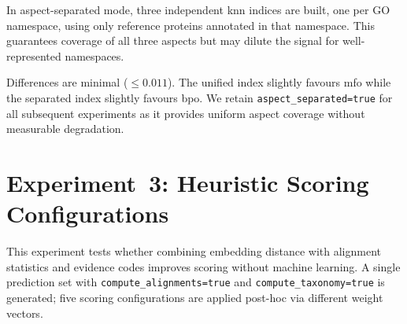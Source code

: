 In aspect-separated mode, three independent \gls{knn} indices are built, one
per GO namespace, using only reference proteins annotated in that namespace.
This guarantees coverage of all three aspects but may dilute the signal for
well-represented namespaces.

\begin{table}[htbp]
  \centering
  \caption[Fmax: aspect-separated vs.\ unified KNN]{$F_{\max}$: aspect-separated vs.\ unified KNN ($k{=}5$).}
  \label{tab:results-aspect-sep}
\end{table}

Differences are minimal ($\leq 0.011$). The unified index slightly favours \gls{mfo}
while the separated index slightly favours \gls{bpo}. We retain
\texttt{aspect\_separated=true} for all subsequent experiments as it provides
uniform aspect coverage without measurable degradation.

\section{Experiment~3: Heuristic Scoring Configurations}
\label{subsec:exp3-scoring}

This experiment tests whether combining embedding distance with alignment
statistics and evidence codes improves scoring without machine learning.
A single prediction set with \texttt{compute\_alignments=true} and
\texttt{compute\_taxonomy=true} is generated; five scoring configurations
are applied post-hoc via different weight vectors.

